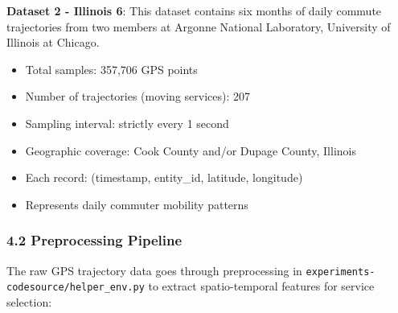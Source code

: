 \documentclass[
  10pt,
  twocolumn,
]{article}
\providecommand{\tightlist}{%
  \setlength{\itemsep}{0pt}\setlength{\parskip}{0pt}}
\begin{document}
\textbf{Dataset 2 - Illinois 6}: This dataset contains six months of
daily commute trajectories from two members at Argonne National
Laboratory, University of Illinois at Chicago.

\begin{itemize}
	\tightlist
	\item
	      Total samples: 357,706 GPS points
	\item
	      Number of trajectories (moving services): 207
	\item
	      Sampling interval: strictly every 1 second
	\item
	      Geographic coverage: Cook County and/or Dupage County, Illinois
	\item
	      Each record: (timestamp, entity\_id, latitude, longitude)
	\item
	      Represents daily commuter mobility patterns
\end{itemize}

\hypertarget{preprocessing-pipeline}{%
	\subsubsection{4.2 Preprocessing
		Pipeline}\label{preprocessing-pipeline}}

The raw GPS trajectory data goes through preprocessing in
\texttt{experiments-codesource/helper\_env.py} to extract
spatio-temporal features for service selection:
\end{document}
